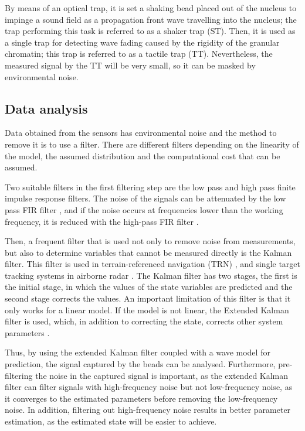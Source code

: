 \documentclass[12pt, a4paper]{article} %
\begin{document}
By means of an optical trap, it is set a shaking bead placed out of the nucleus to impinge a sound field as a propagation front wave travelling into the nucleus; the trap performing this task is referred to as a shaker trap (ST). Then, it is used as a single trap for detecting wave fading caused by the rigidity of the granular chromatin; this trap is referred to as a tactile trap (TT). Nevertheless, the measured signal by the TT will be very small, so it can be masked by environmental noise. 

\setlength{\parskip}{0mm}

\subsection{Data analysis}

Data obtained from the sensors has environmental noise and the method to remove it is to use a filter. There are different filters depending on the linearity of the model, the assumed distribution and the computational cost that can be assumed. 

\setlength{\parskip}{4mm}

Two suitable filters in the first filtering step are the low pass and high pass finite impulse response filters. The noise of the signals can be attenuated by the low pass FIR filter \cite{rabiner1973approximate}, and if the noise occurs at frequencies lower than the working frequency, it is reduced with the high-pass FIR filter \cite{mondal2012novel}.

Then, a frequent filter that is used not only to remove noise from measurements, but also to determine variables that cannot be measured directly is the Kalman filter. This filter is used in terrain-referenced navigation (TRN) \cite{kim2018introduction}, and single target tracking systems in airborne radar \cite{pearson1974Kalman}. The Kalman filter has two stages, the first is the initial stage, in which the values of the state variables are predicted and the second stage corrects the values. An important limitation of this filter is that it only works for a linear model. If the model is not linear, the Extended Kalman filter is used, which, in addition to correcting the state, corrects other system parameters \cite{ribeiro2004Kalman}.

Thus, by using the extended Kalman filter coupled with a wave model for prediction, the signal captured by the beads can be analysed. Furthermore, pre-filtering the noise in the captured signal is important, as the extended Kalman filter can filter signals with high-frequency noise but not low-frequency noise, as it converges to the estimated parameters before removing the low-frequency noise. In addition, filtering out high-frequency noise results in better parameter estimation, as the estimated state will be easier to achieve.
\end{document}
